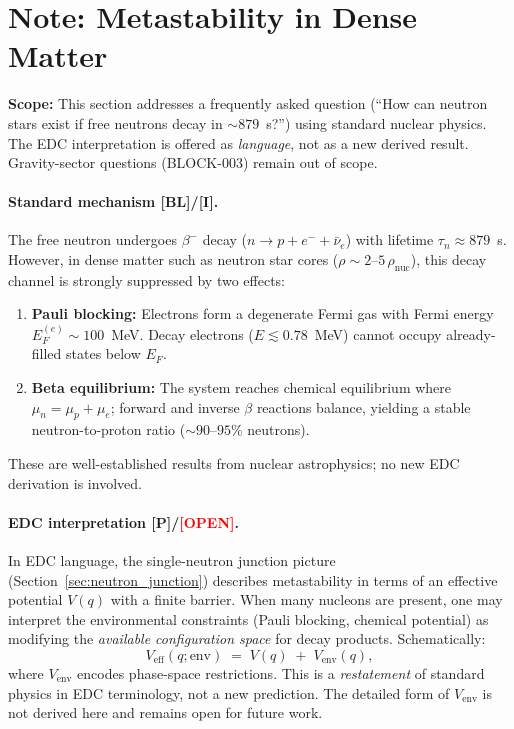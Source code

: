 \documentclass[11pt,a4paper]{article}
\newcommand{\tagP}{\textcolor{red!70!black}{\textbf{[P]}}}
\newcommand{\tagI}{\textcolor{orange!80!black}{\textbf{[I]}}}
\newcommand{\tagBL}{\textcolor{gray!70!black}{\textbf{[BL]}}}
\newcommand{\tagOPEN}{\textcolor{red}{\textbf{[OPEN]}}}
\begin{document}
\section{Note: Metastability in Dense Matter}
\label{sec:ns_metastability}

\begin{statusbox}
\textbf{Scope:} This section addresses a frequently asked question (``How can neutron stars exist if free neutrons decay in $\sim 879$~s?'') using standard nuclear physics. The EDC interpretation is offered as \emph{language}, not as a new derived result. Gravity-sector questions (BLOCK-003) remain out of scope.
\end{statusbox}

\paragraph{Standard mechanism \tagBL{}/\tagI{}.}
The free neutron undergoes $\beta^-$ decay ($n \to p + e^- + \bar\nu_e$) with lifetime $\tau_n \approx 879$~s. However, in dense matter such as neutron star cores ($\rho \sim 2$--$5\,\rho_{\text{nuc}}$), this decay channel is strongly suppressed by two effects:
\begin{enumerate}[nosep]
    \item \textbf{Pauli blocking:} Electrons form a degenerate Fermi gas with Fermi energy $E_F^{(e)} \sim 100$~MeV. Decay electrons ($E \lesssim 0.78$~MeV) cannot occupy already-filled states below $E_F$.
    \item \textbf{Beta equilibrium:} The system reaches chemical equilibrium where $\mu_n = \mu_p + \mu_e$; forward and inverse $\beta$ reactions balance, yielding a stable neutron-to-proton ratio ($\sim 90$--$95\%$ neutrons).
\end{enumerate}
These are well-established results from nuclear astrophysics; no new EDC derivation is involved.

\paragraph{EDC interpretation \tagP{}/\tagOPEN{}.}
In EDC language, the single-neutron junction picture (Section~\ref{sec:neutron_junction}) describes metastability in terms of an effective potential $V(q)$ with a finite barrier. When many nucleons are present, one may interpret the environmental constraints (Pauli blocking, chemical potential) as modifying the \emph{available configuration space} for decay products. Schematically:
\[
V_{\text{eff}}(q; \text{env}) \;=\; V(q) \;+\; V_{\text{env}}(q),
\]
where $V_{\text{env}}$ encodes phase-space restrictions. This is a \emph{restatement} of standard physics in EDC terminology, not a new prediction. The detailed form of $V_{\text{env}}$ is not derived here and remains open for future work.
\end{document}
